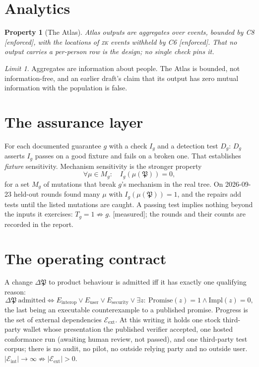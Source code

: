 \documentclass[11pt]{article}
\newtheorem{property}{Property}
\theoremstyle{remark}
\newtheorem*{limit}{Limit}
\newcommand{\PP}{\mathfrak P}
\newcommand{\emark}[1]{\textup{\textsf{[#1]}}}
\newcommand{\st}[1]{\textup{\textsc{#1}}}
\begin{document}
\section{Analytics}

\begin{property}[The Atlas] Atlas outputs are aggregates over events, bounded by C8
\emark{enforced}, with the locations of \st{zk} events withheld by C6 \emark{enforced}. That no
output carries a per-person row is the design; no single check pins it.
\end{property}
\begin{limit}
Aggregates are information about people. The Atlas is bounded, not information-free, and an earlier
draft's claim that its output has zero mutual information with the population is false.
\end{limit}

\section{The assurance layer}

For each documented guarantee $g$ with a check $I_g$ and a detection test $D_g$: $D_g$ asserts
$I_g$ passes on a good fixture and fails on a broken one. That establishes \emph{fixture}
sensitivity. Mechanism sensitivity is the stronger property
\[
\forall \mu\in M_g:\quad I_g(\mu(\PP))=0,
\]
for a set $M_g$ of mutations that break $g$'s mechanism in the real tree. On 2026-09-23 held-out
rounds found many $\mu$ with $I_g(\mu(\PP))=1$, and the repairs add tests until the listed mutations
are caught. A passing test implies nothing beyond the inputs it exercises: $T_g=1\not\Rightarrow g$.
\emark{measured}; the rounds and their counts are recorded in the report.

\section{The operating contract}

A change $\Delta\PP$ to product behaviour is admitted iff it has exactly one qualifying reason:
\[
\Delta\PP\ \text{admitted}\iff E_{\mathrm{interop}}\vee E_{\mathrm{user}}\vee E_{\mathrm{security}}
\vee \exists z:\ \mathrm{Promise}(z)=1\wedge \mathrm{Impl}(z)=0,
\]
the last being an executable counterexample to a published promise. Progress is the set of external
dependencies $\mathcal E_{\mathrm{ext}}$. At this writing it holds one stock third-party wallet whose
presentation the published verifier accepted, one hosted conformance run (awaiting human review, not
passed), and one third-party test corpus; there is no audit, no pilot, no outside relying party and
no outside user. $|\mathcal E_{\mathrm{int}}|\to\infty\not\Rightarrow|\mathcal E_{\mathrm{ext}}|>0$.
\end{document}
